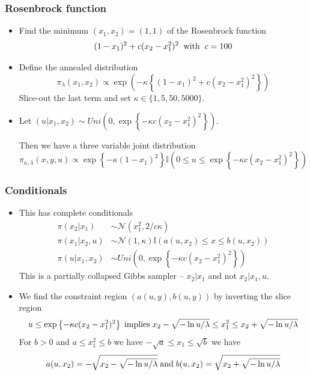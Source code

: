 \documentclass[notes=show,smaller]{beamer}
\begin{document}
\begin{frame}
\frametitle{Rosenbrock function}

\footnotesize
\begin{itemize}
\item
Find the minimum $(x_1,x_2)=(1,1)$ of the Rosenbrock function
$$
( 1- x_1 )^2 + c(x_2-x^2_1)^2 \; \; {\rm with} \; \; c = 100
$$
\item
Define the annealed distribution
$$
\pi_{\lambda} ( x_1 ,x_2) \propto \exp \left ( - \kappa \left \{ ( 1- x_1 )^2 + c(x_2-x^2_1)^2 \right \} \right )
$$
Slice-out the last term and set $ \kappa \in \{ 1 , 5 , 50 , 5000 \} $.
\item
Let $ ( u|x_1,x_2) \sim Uni \left (0, \exp \left \{ -  \kappa c (x_2-x^2_1)^2 \right \} \right ) $.

Then we have a three variable joint distribution
$$
\pi_{\kappa , \lambda} ( x ,y , u )  \propto \exp \left \{ - \kappa ( 1- x_1 )^2 \right \}
 \mathbb{I} \left ( 0 \leq u \leq \exp \left \{ - \kappa c (x_2-x^2_1)^2 \right \} \right )
$$
\end{itemize}
\normalsize

\end{frame}
\begin{frame}
\frametitle{Conditionals}

\footnotesize
\begin{itemize}
\item
This has complete conditionals
\begin{align*}
\pi ( x_2 | x_1 ) & \sim \mathcal{N} ( x^2_1 , 2 / c \kappa  )\\
  \pi ( x_1 | x_2,u ) & \sim \mathcal{N} ( 1 , \kappa  ) \mathbb{I} \left ( a(u,x_2) \leq x \leq b(u,x_2) \right )\\
\pi ( u | x_1 , x_2 ) & \sim Uni \left (0, \exp \left \{ - \kappa c (x_2-x^2_1)^2 \right \} \right )
\end{align*}
This is a partially collapsed Gibbs sampler -- $ x_2 | x_1 $ and not $ x_2 | x_1 , u $.

\item
We find the constraint region $(a(u,y), b(u,y)) $ by inverting the slice region
$$
u \leq \exp \left \{ - \kappa c (x_2-x^2_1)^2 \right \} \; {\rm implies} \; x_2 - \sqrt{ - \ln u / \lambda} \leq x^2_1 \leq  x_2 + \sqrt{ - \ln u / \lambda}
$$
For $b>0$ and $ a \leq x^2_1 \leq b$ we have $ - \sqrt{a} \leq x_1 \leq \sqrt{b} $ we have
$$
a( u, x_2 ) = - \sqrt{ x_2 - \sqrt{ - \ln u / \lambda} } \; {\rm and} \; b( u, x_2 ) = \sqrt{ x_2 + \sqrt{ - \ln u / \lambda} }
$$
\end{itemize}
\normalsize
\end{frame}
\end{document}
